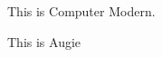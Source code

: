 \documentclass[12pt]{article}
\begin{document}
    This is Computer Modern.

 {\ECFAugie This is Augie}

    
\end{document}
